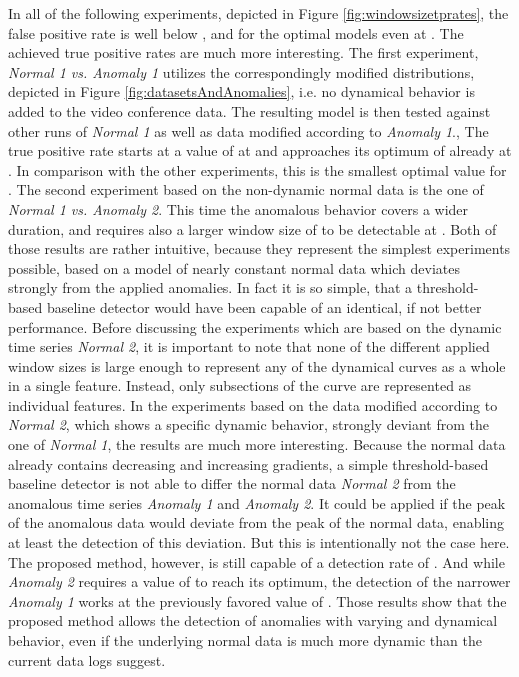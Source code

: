 \documentclass{llncs}
\begin{document}
In all of the following experiments, depicted in Figure \ref{fig:windowsizetprates}, the false positive rate is well below , and for the optimal models even at . The achieved true positive rates are much more interesting. The first experiment, \textit{Normal 1 vs. Anomaly 1} utilizes the correspondingly modified distributions, depicted in Figure \ref{fig:datasetsAndAnomalies}, i.e. no dynamical behavior is added to the video conference data. The resulting model is then tested against other runs of \textit{Normal 1} as well as data modified according to \textit{Anomaly 1}., The true positive rate starts at a value of  at  and approaches its optimum of  already at . In comparison with the other experiments, this is the smallest optimal value for . The second experiment based on the non-dynamic normal data is the one of \textit{Normal 1 vs. Anomaly 2}. This time the anomalous behavior covers a wider duration, and requires also a larger window size of  to be detectable at . Both of those results are rather intuitive, because they represent the simplest experiments possible, based on a model of nearly constant normal data which deviates strongly from the applied anomalies. In fact it is so simple, that a threshold-based baseline detector would have been capable of an identical, if not better performance.
Before discussing the experiments which are based on the dynamic time series \textit{Normal 2}, it is important to note that none of the different applied window sizes is large enough to represent any of the dynamical curves as a whole in a single feature. Instead, only subsections of the curve are represented as individual features.
In the experiments based on the data modified according to \textit{Normal 2}, which shows a specific dynamic behavior, strongly deviant from the one of \textit{Normal 1}, the results are much more interesting. Because the normal data already contains decreasing and increasing gradients, a simple threshold-based baseline detector is not able to differ the normal data \textit{Normal 2} from the anomalous time series \textit{Anomaly 1} and \textit{Anomaly 2}. It could be applied if the peak of the anomalous data would deviate from the peak of the normal data, enabling at least the detection of this deviation. But this is intentionally not the case here. The proposed method, however, is still capable of a detection rate of . And while \textit{Anomaly 2} requires a value of  to reach its optimum, the detection of the narrower \textit{Anomaly 1} works at the previously favored value of . Those results show that the proposed method allows the detection of anomalies with varying and dynamical behavior, even if the underlying normal data is much more dynamic than the current data logs suggest.
\end{document}
